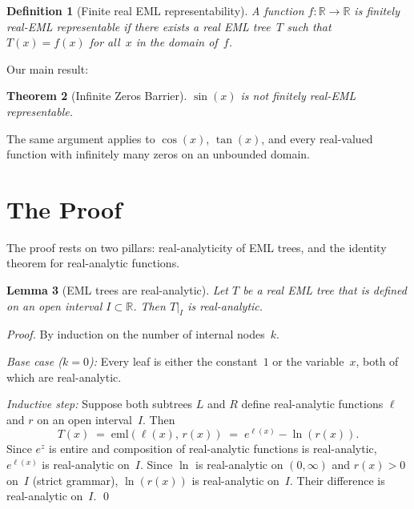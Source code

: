 \documentclass[11pt,a4paper]{amsart}
\newtheorem{theorem}{Theorem}
\newtheorem{lemma}[theorem]{Lemma}
\newtheorem{definition}[theorem]{Definition}
\newcommand{\eml}{\mathrm{eml}}
\newcommand{\R}{\mathbb{R}}
\begin{document}
\begin{definition}[Finite real EML representability]
  A function $f : \R \to \R$ is \emph{finitely real-EML representable} if
  there exists a real EML tree~$T$ such that $T(x) = f(x)$ for all~$x$ in
  the domain of~$f$.
\end{definition}

Our main result:

\begin{theorem}[Infinite Zeros Barrier]
  \label{thm:main}
  $\sin(x)$ is not finitely real-EML representable.
\end{theorem}

The same argument applies to $\cos(x)$, $\tan(x)$, and every real-valued
function with infinitely many zeros on an unbounded domain.

\section{The Proof}

The proof rests on two pillars: real-analyticity of EML trees, and the
identity theorem for real-analytic functions.

\begin{lemma}[EML trees are real-analytic]
  \label{lem:analytic}
  Let $T$ be a real EML tree that is defined on an open interval $I \subset \R$.
  Then $T|_I$ is real-analytic.
\end{lemma}

\begin{proof}
  By induction on the number of internal nodes~$k$.

  \emph{Base case ($k = 0$):} Every leaf is either the constant~$1$ or the
  variable~$x$, both of which are real-analytic.

  \emph{Inductive step:} Suppose both subtrees $L$ and $R$ define real-analytic
  functions $\ell$ and $r$ on an open interval~$I$.  Then
  \[
    T(x) \;=\; \eml(\ell(x),\, r(x)) \;=\; e^{\ell(x)} - \ln(r(x)).
  \]
  Since $e^z$ is entire and composition of real-analytic functions is real-analytic,
  $e^{\ell(x)}$ is real-analytic on~$I$.  Since $\ln$ is real-analytic on
  $(0,\infty)$ and $r(x) > 0$ on~$I$ (strict grammar), $\ln(r(x))$ is
  real-analytic on~$I$.  Their difference is real-analytic on~$I$. \qed
\end{proof}
\end{document}
